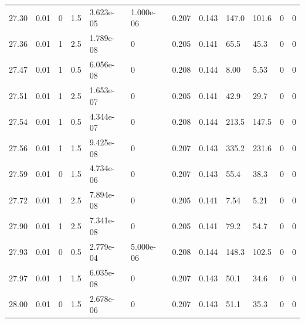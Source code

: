 \documentclass[preview]{standalone}
\begin{document}
{{{{{{{{\begin{tabular}{L{1.2cm}C{1.2cm} C{0.3cm}C{0.5cm} C{1.4cm}C{1.4cm} C{1.4cm}C{1.4cm} C{1.6cm}C{1.6cm} C{1.6cm}C{1.6cm}}
  27.30  &  0.01  & 0     & 1.5 &  3.623e-05  & 1.000e-06  &  0.207&   0.143& 147.0 & 101.6   &  0 & 0  \\ 
  27.36  &  0.01  & 1     & 2.5 &  1.789e-08  & 0  &  0.205&   0.141& 65.5 & 45.3   &  0 & 0  \\ 
  27.47  &  0.01  & 1     & 0.5 &  6.056e-08  & 0  &  0.208&   0.144& 8.00 & 5.53   &  0 & 0  \\ 
  27.51  &  0.01  & 1     & 2.5 &  1.653e-07  & 0  &  0.205&   0.141& 42.9 & 29.7   &  0 & 0  \\ 
  27.54  &  0.01  & 1     & 0.5 &  4.344e-07  & 0  &  0.208&   0.144& 213.5 & 147.5   &  0 & 0  \\ 
  27.56  &  0.01  & 1     & 1.5 &  9.425e-08  & 0  &  0.207&   0.143& 335.2 & 231.6   &  0 & 0  \\ 
  27.59  &  0.01  & 0     & 1.5 &  4.734e-06  & 0  &  0.207&   0.143& 55.4 & 38.3   &  0 & 0  \\ 
  27.72  &  0.01  & 1     & 2.5 &  7.894e-08  & 0  &  0.205&   0.141& 7.54 & 5.21   &  0 & 0  \\ 
  27.90  &  0.01  & 1     & 2.5 &  7.341e-08  & 0  &  0.205&   0.141& 79.2 & 54.7   &  0 & 0  \\ 
  27.93  &  0.01  & 0     & 0.5 &  2.779e-04  & 5.000e-06  &  0.208&   0.144& 148.3 & 102.5   &  0 & 0  \\ 
  27.97  &  0.01  & 1     & 1.5 &  6.035e-08  & 0  &  0.207&   0.143& 50.1 & 34.6   &  0 & 0  \\ 
  28.00  &  0.01  & 0     & 1.5 &  2.678e-06  & 0  &  0.207&   0.143& 51.1 & 35.3   &  0 & 0  \\ 
\hline 
\end{tabular} 

}}}}}}}}
\end{document}
